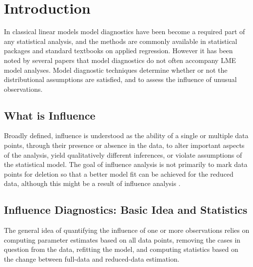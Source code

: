 \documentclass[12pt, a4paper]{article}
\begin{document}
	

\section{Introduction}%
In classical linear models model diagnostics have been become a required part of any statistical analysis, and the methods are commonly available in statistical packages and standard textbooks on applied regression. However it has been noted by several papers that model diagnostics do not often accompany LME model analyses.
Model diagnostic techniques determine whether or not the distributional assumptions are satisfied, and to assess the influence of unusual observations.

\subsection{What is Influence} %


Broadly defined, influence is understood as the ability of a single or multiple data points, through their presence or absence in the data, to alter important aspects of the analysis, yield qualitatively different inferences, or violate assumptions of the statistical model. The goal of influence analysis is not primarily to mark data
points for deletion so that a better model fit can be achieved for the reduced data, although this might be a result of influence analysis \citep{schabenberger}.

\newpage
\subsection{Influence Diagnostics: Basic Idea and Statistics} %

The general idea of quantifying the influence of one or more observations relies on computing parameter estimates based on all data points, removing the cases in question from the data, refitting the model, and computing statistics based on the change between full-data and reduced-data estimation. 
\end{document}

